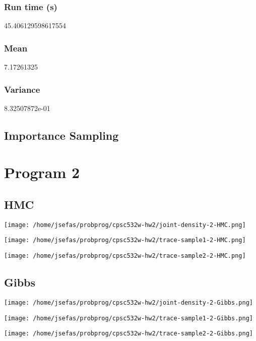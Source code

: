 \documentclass[11pt]{article}
\begin{document}
\subsubsection*{Run time (s)}
\label{sec:orgd453c7b}
45.406129598617554
\subsubsection*{Mean}
\label{sec:org03c64a4}
7.17261325
\subsubsection*{Variance}
\label{sec:org17f03c7}
8.32507872e-01

\subsection*{Importance Sampling}
\label{sec:orgd29a7f3}

\section*{Program 2}
\label{sec:orgff6443d}
\subsection*{HMC}
\label{sec:org0fa3f50}
\begin{center}
\texttt{[image: /home/jsefas/probprog/cpsc532w-hw2/joint-density-2-HMC.png]}
\end{center}
\begin{center}
\texttt{[image: /home/jsefas/probprog/cpsc532w-hw2/trace-sample1-2-HMC.png]}
\end{center}
\begin{center}
\texttt{[image: /home/jsefas/probprog/cpsc532w-hw2/trace-sample2-2-HMC.png]}
\end{center}

\subsection*{Gibbs}
\label{sec:org13edd46}
\begin{center}
\texttt{[image: /home/jsefas/probprog/cpsc532w-hw2/joint-density-2-Gibbs.png]}
\end{center}
\begin{center}
\texttt{[image: /home/jsefas/probprog/cpsc532w-hw2/trace-sample1-2-Gibbs.png]}
\end{center}
\begin{center}
\texttt{[image: /home/jsefas/probprog/cpsc532w-hw2/trace-sample2-2-Gibbs.png]}
\end{center}
\end{document}

